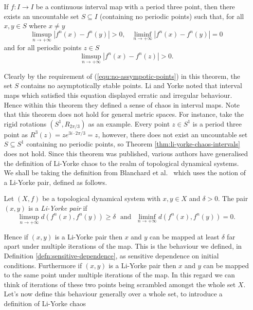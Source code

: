 \begin{thm} \label{thm:li-yorke-chaos-intervals}
    If $f: I \to I$ be a continuous interval map with a period three point, then there exists an uncountable set $S \subseteq I$ (containing no periodic points) such that, for all $x, y \in S$ where $x \neq y$
    \[\limsup_{n \to +\infty}\left\lvert f^n(x) - f^n(y) \right\rvert > 0, \ \ \ \ \liminf_{n \to +\infty}\left\lvert f^n(x) - f^n(y) \right\rvert = 0\] and for all periodic points $z \in S$ \begin{equation} \label{equ:no-assympotic-points}\limsup_{n \to +\infty}\left\lvert f^n(x) - f^n(z) \right\rvert > 0.\end{equation}
\end{thm}

Clearly by the requirement of (\ref{equ:no-assympotic-points}) in this theorem, the set $S$ contains no asymptotically stable points. Li and Yorke noted that interval maps which satisfied this equation displayed erratic and irregular behaviour. Hence within this theorem they defined a sense of chaos in interval maps. Note that this theorem does not hold for general metric spaces. For instance, take the rigid rotations $(S^1, R_{2\pi/3})$ as an example. Every point $z \in S^1$ is a period three point as $R^3(z) = ze^{3i \cdot 2\pi/3} = z$, however, there does not exist an uncountable set $S \subseteq S^1$ containing no periodic points, so Theorem \ref{thm:li-yorke-chaos-intervals} does not hold. Since this theorem was published, various authors have generalised the definition of Li-Yorke chaos to the realm of topological dynamical systems. We shall be taking the definition from Blanchard et al.\ \cite{bgsm} which uses the notion of a Li-Yorke pair, defined as follows.

\begin{defn} \label{defn:li-yorke-pair}
    Let $(X, f)$ be a topological dynamical system with $x, y \in X$ and $\delta > 0$. The pair $(x, y)$ is a \emph{Li-Yorke pair} if \[\limsup_{n \to +\infty} d\left( f^n(x), f^n(y) \right) \geq \delta \ \ \ \text{and} \ \ \ \liminf_{n\to+\infty} d\left( f^n(x), f^n(y) \right) = 0.\]
\end{defn}

Hence if $(x, y)$ is a Li-Yorke pair then $x$ and $y$ can be mapped at least $\delta$ far apart under multiple iterations of the map. This is the behaviour we defined, in Definition \ref{defn:sensitive-dependence}, as sensitive dependence on initial conditions. Furthermore if $(x, y)$ is a Li-Yorke pair then $x$ and $y$ can be mapped to the same point under multiple iterations of the map. In this regard we can think of iterations of these two points being scrambled amongst the whole set $X$. Let's now define this behaviour generally over a whole set, to introduce a definition of Li-Yorke chaos

